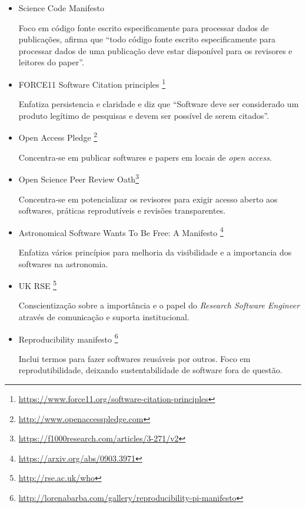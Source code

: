\begin{itemize}

  \item Science Code Manifesto \cite{barnes2013science}

    Foco em código fonte escrito especificamente para processar dados de
    publicações, afirma que ``todo código fonte escrito especificamente para
    processar dados de uma publicação deve estar disponível para os revisores e
    leitores do paper''.

  \item FORCE11 Software Citation principles \cite{smith2016software}\footnote{\url{https://www.force11.org/software-citation-principles}}

    Enfatiza persistencia e claridade e diz que ``Software deve ser considerado
    um produto legítimo de pesquisas e devem ser possível de serem citados''.

  \item Open Access Pledge \cite{holcombe2011openaccess}\footnote{\url{http://www.openaccesspledge.com}}

    Concentra-se em publicar softwares e papers em locais de {\it open access}.

  \item Open Science Peer Review Oath\footnote{\url{https://f1000research.com/articles/3-271/v2}}

    Concentra-se em potencializar os revisores para exigir acesso aberto aos
    softwares, práticas reprodutíveis e revisões transparentes.

  \item Astronomical Software Wants To Be Free: A Manifesto \cite{weiner2009astronomical}\footnote{\url{https://arxiv.org/abs/0903.3971}}

    Enfatiza vários princípios para melhoria da visibilidade e a importancia dos softwares na astronomia.

  \item UK RSE \cite{ukrse2013}\footnote{\url{http://rse.ac.uk/who}}

    Conscientização sobre a importância e o papel do {\it Research Software
    Engineer} através de comunicação e suporta institucional.

  \item Reproducibility manifesto \cite{Barba2012}\footnote{\url{http://lorenabarba.com/gallery/reproducibility-pi-manifesto}}

    Inclui termos para fazer softwares reusáveis por outros. Foco em
    reprodutibilidade, deixando sustentabilidade de software fora de questão.


\end{itemize}
